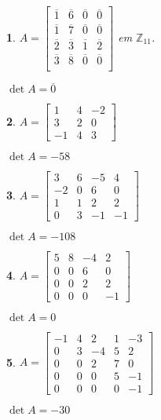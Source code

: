 \documentclass[12pt]{exam}
\newtheorem{exercicio}{}
\newcommand{\integer}{\mathbb{Z}}
\begin{document}
\begin{exercicio}
$A = \begin{bmatrix}
    \overline{1} & \overline{6} & \overline{0} & \overline{0}\\
    \overline{1} & \overline{7} & \overline{0} & \overline{0}\\
    \overline{2} & \overline{3} & \overline{1} & \overline{2}\\
    \overline{3} & \overline{8} & \overline{0} & \overline{0}\\
    \end{bmatrix}$ em $\integer_{11}$.
\begin{solucao}
  $\det A = \overline{0}$
\end{solucao}
\end{exercicio}


\begin{exercicio}
$A = \begin{bmatrix}
    1 & 4 & -2\\
    3 & 2 & 0\\
    -1 & 4 & 3
    \end{bmatrix}$
\begin{solucao}
  $\det A = -58$
\end{solucao}
\end{exercicio}

\begin{exercicio}
$A = \begin{bmatrix}
    3 & 6 & -5 & 4\\
    -2 & 0 & 6 & 0\\
    1 & 1 & 2 & 2\\
    0 & 3 & -1 & -1
    \end{bmatrix}$
\begin{solucao}
  $\det A = -108$
\end{solucao}
\end{exercicio}

\begin{exercicio}
$A = \begin{bmatrix}
    5 & 8 & -4 & 2\\
    0 & 0 & 6 & 0\\
    0 & 0 & 2 & 2\\
    0 & 0 & 0 & -1
    \end{bmatrix}$
\begin{solucao}
  $\det A = 0$
\end{solucao}
\end{exercicio}

\begin{exercicio}
$A = \begin{bmatrix}
    -1 & 4 & 2 & 1 & -3\\
    0 & 3 & -4 & 5 & 2\\
    0 & 0 & 2 & 7 & 0\\
    0 & 0 & 0 & 5 & -1\\
    0 & 0 & 0 & 0 & -1
    \end{bmatrix}$
\begin{solucao}
  $\det A = -30$
\end{solucao}
\end{exercicio}
\end{document}
